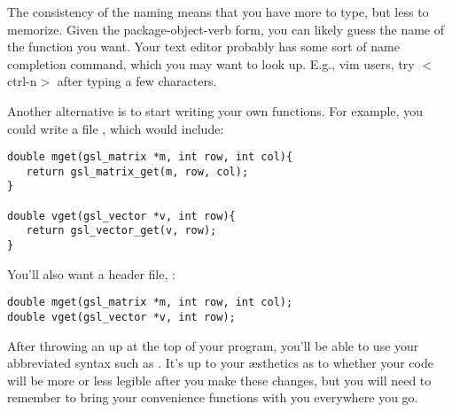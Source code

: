 The consistency of the naming means that you have more to type, but
less to memorize. Given the package-object-verb form, you can likely
guess the name of the function you want. Your text editor probably has
some sort of name completion command, which you may want to look up. E.g.,
vim users, try $<$ctrl-n$>$ after typing a few characters.

Another alternative is to start writing your own functions. For example, you
could write a file , which would include:

\begin{lstlisting}
double mget(gsl_matrix *m, int row, int col){
   return gsl_matrix_get(m, row, col);
}

double vget(gsl_vector *v, int row){
   return gsl_vector_get(v, row);
}
\end{lstlisting}

You'll also want a header file, :
\begin{lstlisting}
double mget(gsl_matrix *m, int row, int col);
double vget(gsl_vector *v, int row);
\end{lstlisting}

After throwing an  up at the top of your
program, you'll be able to use your abbreviated syntax such as .
It's up to your \ae sthetics as to whether your code will be more or less
legible after you make these changes, but you will need to remember to
bring your convenience functions with you everywhere you go.


